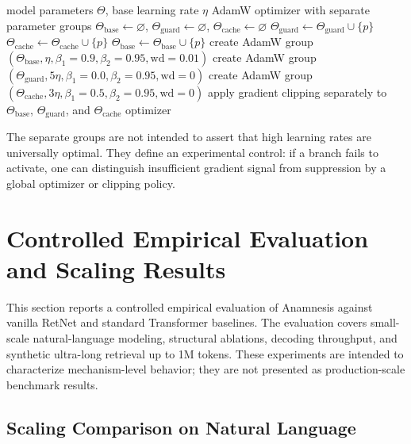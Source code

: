 \documentclass[preprint,12pt]{elsarticle}
\begin{document}
\begin{algorithm}[H]
\caption{Optimizer grouping for guarded memory branches}
\label{alg:optim}
\begin{algorithmic}[1]
\Require model parameters $\Theta$, base learning rate $\eta$
\Ensure AdamW optimizer with separate parameter groups
\State $\Theta_{\mathrm{base}}\gets\varnothing$, $\Theta_{\mathrm{guard}}\gets\varnothing$, $\Theta_{\mathrm{cache}}\gets\varnothing$
        \State $\Theta_{\mathrm{guard}}\gets\Theta_{\mathrm{guard}}\cup\{p\}$
        \State $\Theta_{\mathrm{cache}}\gets\Theta_{\mathrm{cache}}\cup\{p\}$
    \Else
        \State $\Theta_{\mathrm{base}}\gets\Theta_{\mathrm{base}}\cup\{p\}$
    \EndIf
\EndFor
\State create AdamW group $(\Theta_{\mathrm{base}},\eta,\beta_1=0.9,\beta_2=0.95,\mathrm{wd}=0.01)$
\State create AdamW group $(\Theta_{\mathrm{guard}},5\eta,\beta_1=0.0,\beta_2=0.95,\mathrm{wd}=0)$
\State create AdamW group $(\Theta_{\mathrm{cache}},3\eta,\beta_1=0.5,\beta_2=0.95,\mathrm{wd}=0)$
\State apply gradient clipping separately to $\Theta_{\mathrm{base}}$, $\Theta_{\mathrm{guard}}$, and $\Theta_{\mathrm{cache}}$
\State \Return optimizer
\end{algorithmic}
\end{algorithm}

The separate groups are not intended to assert that high learning rates are universally optimal. They define an experimental control: if a branch fails to activate, one can distinguish insufficient gradient signal from suppression by a global optimizer or clipping policy.

\section{Controlled Empirical Evaluation and Scaling Results}
\label{sec:empirical-results}

This section reports a controlled empirical evaluation of Anamnesis against vanilla RetNet and standard Transformer baselines. The evaluation covers small-scale natural-language modeling, structural ablations, decoding throughput, and synthetic ultra-long retrieval up to 1M tokens. These experiments are intended to characterize mechanism-level behavior; they are not presented as production-scale benchmark results.

\subsection{Scaling Comparison on Natural Language}
\end{document}
